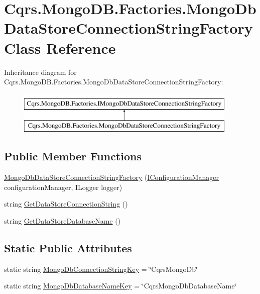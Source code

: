 \hypertarget{classCqrs_1_1MongoDB_1_1Factories_1_1MongoDbDataStoreConnectionStringFactory}{}\section{Cqrs.\+Mongo\+D\+B.\+Factories.\+Mongo\+Db\+Data\+Store\+Connection\+String\+Factory Class Reference}
\label{classCqrs_1_1MongoDB_1_1Factories_1_1MongoDbDataStoreConnectionStringFactory}
Inheritance diagram for Cqrs.\+Mongo\+D\+B.\+Factories.\+Mongo\+Db\+Data\+Store\+Connection\+String\+Factory\+:\begin{figure}[H]
\begin{center}
\leavevmode
\includegraphics[height=2.000000cm]{classCqrs_1_1MongoDB_1_1Factories_1_1MongoDbDataStoreConnectionStringFactory}
\end{center}
\end{figure}
\subsection*{Public Member Functions}
\begin{DoxyCompactItemize}
\item 
\hyperlink{classCqrs_1_1MongoDB_1_1Factories_1_1MongoDbDataStoreConnectionStringFactory_a9ccb753772ee1aa374ad39ba5b93700f}{Mongo\+Db\+Data\+Store\+Connection\+String\+Factory} (\hyperlink{interfaceCqrs_1_1Configuration_1_1IConfigurationManager}{I\+Configuration\+Manager} configuration\+Manager, I\+Logger logger)
\item 
string \hyperlink{classCqrs_1_1MongoDB_1_1Factories_1_1MongoDbDataStoreConnectionStringFactory_a76986fcc9521c87bfbb6e417ef13cd53}{Get\+Data\+Store\+Connection\+String} ()
\item 
string \hyperlink{classCqrs_1_1MongoDB_1_1Factories_1_1MongoDbDataStoreConnectionStringFactory_ab8729212ac8fe8350dead56fc89a5fd2}{Get\+Data\+Store\+Database\+Name} ()
\end{DoxyCompactItemize}
\subsection*{Static Public Attributes}
\begin{DoxyCompactItemize}
\item 
static string \hyperlink{classCqrs_1_1MongoDB_1_1Factories_1_1MongoDbDataStoreConnectionStringFactory_af6b4a1e2a8dfaa3989ec3c6d0f0803e1}{Mongo\+Db\+Connection\+String\+Key} = \char`\"{}Cqrs\+Mongo\+Db\char`\"{}
\item 
static string \hyperlink{classCqrs_1_1MongoDB_1_1Factories_1_1MongoDbDataStoreConnectionStringFactory_ae0a5d15a403e61d3ce71a8cdabe01525}{Mongo\+Db\+Database\+Name\+Key} = \char`\"{}Cqrs\+Mongo\+Db\+Database\+Name\char`\"{}
\end{DoxyCompactItemize}
